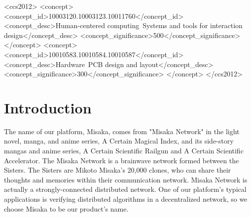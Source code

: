 \documentclass[sigconf]{acmart}
\begin{document}
\begin{CCSXML}
  <ccs2012>
     <concept>
         <concept_id>10003120.10003123.10011760</concept_id>
         <concept_desc>Human-centered computing~Systems and tools for interaction design</concept_desc>
         <concept_significance>500</concept_significance>
         </concept>
     <concept>
         <concept_id>10010583.10010584.10010587</concept_id>
         <concept_desc>Hardware~PCB design and layout</concept_desc>
         <concept_significance>300</concept_significance>
         </concept>
   </ccs2012>
\end{CCSXML}




\maketitle

\section{Introduction}

The name of our platform, Misaka, comes from "Misaka Network" in the light novel, manga, and anime series, A Certain Magical Index, and its side-story mangas and anime series, A Certain Scientific Railgun and A Certain Scientific Accelerator. The Misaka Network is a brainwave network formed between the Sisters. The Sisters are Mikoto Misaka's 20,000 clones, who can share their thoughts and memories within their communication network. Misaka Network is actually a strongly-connected distributed network. One of our platform's typical applications is verifying distributed algorithms in a decentralized network, so we choose Misaka to be our product's name.
\end{document}
